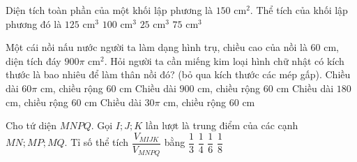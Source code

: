 \begin{ex}%
Diện tích toàn phần của một khối lập phương là $150$ cm$^2$. Thể tích của khối lập phương đó là
\choice
{\True $125$ cm$^3$}
{$100$ cm$^3$}
{$25$ cm$^3$}
{$75$ cm$^3$}
\end{ex}
\begin{ex}%
Một cái nồi nấu nước người ta làm dạng hình trụ, chiều cao của nồi là $60$ cm, diện tích đáy $900\pi$ cm$^2$. Hỏi người ta cần miếng kim loại hình chữ nhật có kích thước là bao nhiêu để làm thân nồi đó? (bỏ qua kích thước các mép gấp). 
\choice
{\True Chiều dài $60\pi$ cm, chiều rộng $60$ cm}
{Chiều dài $900$ cm, chiều rộng $60$ cm}
{Chiều dài $180$ cm, chiều rộng $60$ cm}
{Chiều dài $30\pi$ cm, chiều rộng $60$ cm}
\end{ex}
\begin{ex}%
Cho tứ diện $MNPQ$. Gọi $I; J; K$ lần lượt là trung điểm của các cạnh $MN; MP; MQ$. Tỉ số thể tích $\dfrac{V_{MIJK}}{V_{MNPQ}}$ bằng
\choice
{$\dfrac{1}{3}$}
{$\dfrac{1}{4}$}
{$\dfrac{1}{6}$}
{\True $\dfrac{1}{8}$}
\end{ex}
